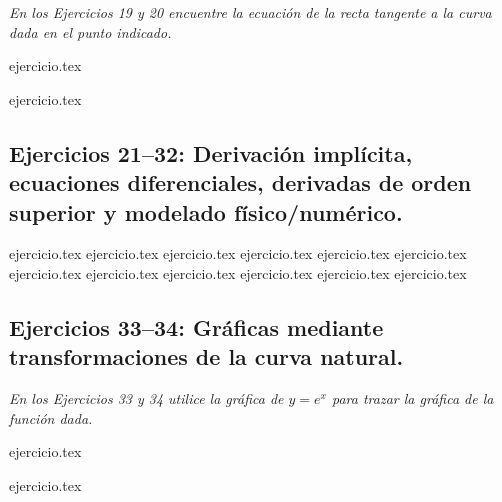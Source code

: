 \noindent \textit{En los Ejercicios 19 y 20 encuentre la ecuación de la recta tangente a la curva dada en el punto indicado.}

\begin{enumerate}
    \setcounter{enumi}{18}
    \begin{minipage}{0.45\textwidth}
    {ejercicio.tex}
    \end{minipage}%
    \begin{minipage}{0.45\textwidth}
    {ejercicio.tex}
    \end{minipage}
\end{enumerate}

\subsection*{Ejercicios 21--32: Derivación implícita, ecuaciones diferenciales, derivadas de orden superior y modelado físico/numérico.}

\begin{enumerate}
    \setcounter{enumi}{20}
    {ejercicio.tex}
    {ejercicio.tex}
    {ejercicio.tex}
    {ejercicio.tex}
    {ejercicio.tex}
    {ejercicio.tex}
    {ejercicio.tex}
    {ejercicio.tex}
    {ejercicio.tex}
    {ejercicio.tex}
    {ejercicio.tex}
    {ejercicio.tex}
\end{enumerate}

\subsection*{Ejercicios 33--34: Gráficas mediante transformaciones de la curva natural.}

\noindent \textit{En los Ejercicios 33 y 34 utilice la gráfica de $y = e^x$ para trazar la gráfica de la función dada.}

\begin{enumerate}
    \setcounter{enumi}{32}
    \begin{minipage}{0.45\textwidth}
    {ejercicio.tex}
    \end{minipage}%
    \begin{minipage}{0.45\textwidth}
    {ejercicio.tex}
    \end{minipage}
\end{enumerate}

